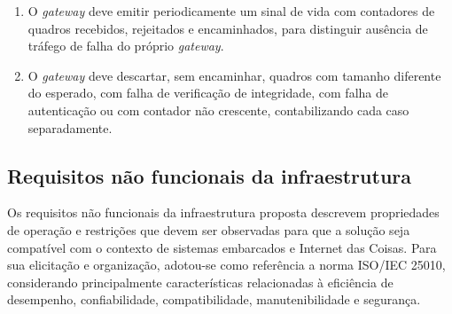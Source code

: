 \begin{enumerate}
    \item[RF-I11.] O \textit{gateway} deve emitir periodicamente um sinal de vida com contadores de quadros recebidos, rejeitados e encaminhados, para distinguir ausência de tráfego de falha do próprio \textit{gateway}.

    \item[RF-I12.] O \textit{gateway} deve descartar, sem encaminhar, quadros com tamanho diferente do esperado, com falha de verificação de integridade, com falha de autenticação ou com contador não crescente, contabilizando cada caso separadamente.

\end{enumerate}


\subsection{Requisitos não funcionais da infraestrutura}

Os requisitos não funcionais da infraestrutura proposta descrevem propriedades de operação e restrições que devem ser observadas para que a solução seja compatível com o contexto de sistemas embarcados e Internet das Coisas. Para sua elicitação e organização, adotou-se como referência a norma ISO/IEC 25010, considerando principalmente características relacionadas à eficiência de desempenho, confiabilidade, compatibilidade, manutenibilidade e segurança.

